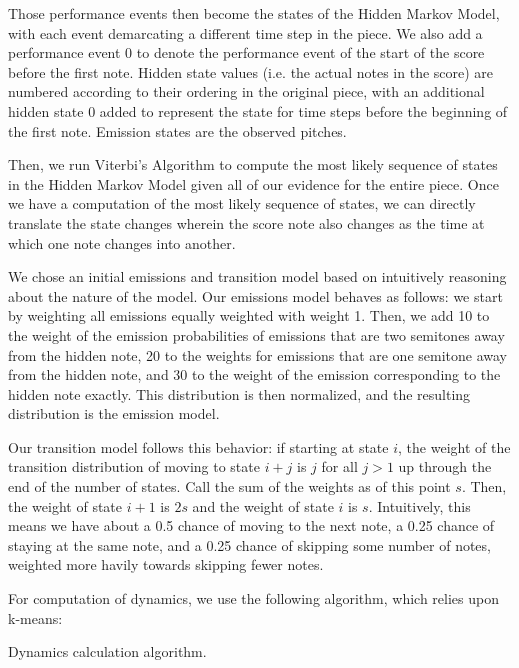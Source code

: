 \documentclass[11pt]{article}
\begin{document}
Those performance events then become the states of the Hidden Markov
Model, with each event demarcating a different time step in the piece.
We also add a performance event 0 to denote the performance event
of the start of the score before the first note.
Hidden state values (i.e. the actual notes in the score)
are numbered according to their ordering in the original piece,
with an additional hidden state 0 added to represent the state for
time steps before the beginning of the first note. Emission states are
the observed pitches.

Then, we run Viterbi's Algorithm to compute the
most likely sequence of states in the Hidden Markov Model given all
of our evidence for the entire piece.
Once we have a computation of the most likely sequence of states,
we can directly translate the state changes wherein the score note
also changes as the time at which one note changes into another.

We chose an initial emissions and transition model based on
intuitively reasoning about the nature of the model. Our emissions
model behaves as follows: we start by weighting all emissions equally
weighted with weight 1.
Then, we add 10 to the weight of the emission probabilities of emissions
that are two semitones away from the hidden note, 20 to the weights
for emissions that are one semitone away from the hidden note, and 30
to the weight of the emission corresponding to the hidden note exactly.
This distribution is then normalized, and the resulting distribution
is the emission model.

Our transition model follows this behavior: if starting at state $i$, the weight
of the transition distribution of moving to state $i+j$ is $j$ for all $j > 1$ up through
the end of the number of states. Call the sum of the weights as of this point $s$.
Then, the weight of state $i + 1$ is $2s$ and the weight of state $i$ is $s$.
Intuitively, this means we have about a 0.5 chance of moving to the next note, a 0.25
chance of staying at the same note, and a 0.25 chance of skipping some number of notes,
weighted more havily towards skipping fewer notes.

For computation of dynamics, we use the following algorithm, which relies
upon k-means:

\begin{algorithm}
  \begin{algorithmic}
    \EndProcedure{}
  \end{algorithmic}
  \caption{Dynamics calculation algorithm.}
\end{algorithm}
\end{document}
